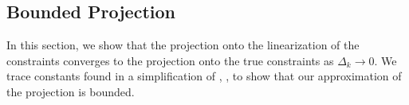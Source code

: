 \documentclass{article}
\newtheorem{theorem}{Theorem}[section]
\theoremstyle{case}
\newcommand{\xk}{{x^{(k)}}}
\newcommand{\dk}{\Delta_k}
\newcommand{\wik}{{w^{(i, k)}}}
\begin{document}
% 
% 
% 
% 
% 
% 
% 




\subsection{Bounded Projection}

In this section, we show that the projection onto the linearization of the constraints converges to the projection onto the true constraints as $\dk \to 0$.
We trace constants found in a simplification of \cite{dummy:hoffman}, \cite{dummy:continuity_of_inverse}, \cite{dummy:perturbations} to show that our approximation of the projection is bounded.
\end{document}
